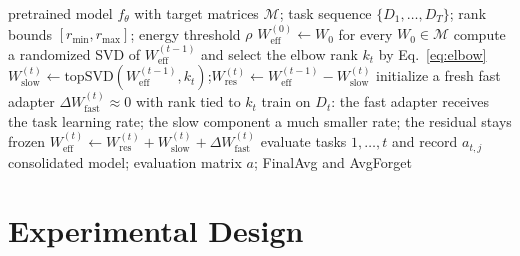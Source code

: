 \documentclass[11pt]{article}
\begin{document}
\begin{algorithm}[t]
\caption{ReCoLoRA continual fine-tuning with recursive consolidation. The static single-adapter variant (Appendix~\ref{app:ablations}) skips the per-task re-decomposition and instead trains one adapter on top of the frozen $W_0$ with the two-stage principal-to-residual schedule; ReCoLoRA-TaskBank instead instantiates one branch per task and freezes finished branches.}
\label{alg:recolora}
\begin{algorithmic}[1]
\Require pretrained model $f_{\theta}$ with target matrices $\mathcal{M}$; task sequence $\{D_1,\ldots,D_T\}$; rank bounds $[r_{\min},r_{\max}]$; energy threshold $\rho$
\State $W_{\mathrm{eff}}^{(0)} \gets W_0$ for every $W_0 \in \mathcal{M}$
        \State compute a randomized SVD of $W_{\mathrm{eff}}^{(t-1)}$ and select the elbow rank $k_t$ by Eq.~\ref{eq:elbow}
        \State $W_{\mathrm{slow}}^{(t)} \gets \mathrm{topSVD}(W_{\mathrm{eff}}^{(t-1)},k_t)$;\quad $W_{\mathrm{res}}^{(t)} \gets W_{\mathrm{eff}}^{(t-1)} - W_{\mathrm{slow}}^{(t)}$ 
        \State initialize a fresh fast adapter $\Delta W_{\mathrm{fast}}^{(t)} \approx 0$ with rank tied to $k_t$
    \EndFor
    \State train on $D_t$: the fast adapter receives the task learning rate; the slow component a much smaller rate; the residual stays frozen
    \State $W_{\mathrm{eff}}^{(t)} \gets W_{\mathrm{res}}^{(t)} + W_{\mathrm{slow}}^{(t)} + \Delta W_{\mathrm{fast}}^{(t)}$ 
    \State evaluate tasks $1,\ldots,t$ and record $a_{t,j}$
\EndFor
\Ensure consolidated model; evaluation matrix $a$; FinalAvg and AvgForget
\end{algorithmic}
\end{algorithm}

\section{Experimental Design}
\end{document}

